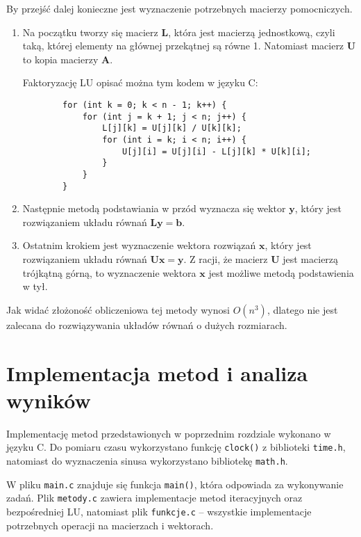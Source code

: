\documentclass{article}
\begin{document}
By przejść dalej konieczne jest wyznaczenie potrzebnych macierzy pomocniczych.
\begin{enumerate}
    \item Na początku tworzy się macierz $\boldsymbol{L}$, która jest macierzą 
    jednostkową, czyli taką, której elementy na głównej przekątnej są równe 1.
    Natomiast macierz $\boldsymbol{U}$ to kopia macierzy $\boldsymbol{A}$.
    
    Faktoryzację LU opisać można tym kodem w języku C:
    
    \begin{lstlisting}
        for (int k = 0; k < n - 1; k++) {
            for (int j = k + 1; j < n; j++) {
                L[j][k] = U[j][k] / U[k][k];
                for (int i = k; i < n; i++) {
                    U[j][i] = U[j][i] - L[j][k] * U[k][i];
                }
            }
        }
    \end{lstlisting}

    \item Następnie metodą podstawiania w przód wyznacza 
    się wektor $\boldsymbol{y}$,
    który jest rozwiązaniem układu równań $\boldsymbol{Ly = b}$.

    \item Ostatnim krokiem jest wyznaczenie wektora rozwiązań $\boldsymbol{x}$,
    który jest rozwiązaniem układu równań $\boldsymbol{Ux = y}$.
    Z racji, że macierz $\boldsymbol{U}$ jest macierzą trójkątną górną,
    to wyznaczenie wektora $\boldsymbol{x}$ jest możliwe metodą 
    podstawienia w tył.
\end{enumerate}

Jak widać złożoność obliczeniowa tej metody wynosi $O(n^3)$, dlatego
nie jest zalecana do rozwiązywania układów równań o dużych rozmiarach.

\section{Implementacja metod i analiza wyników}
Implementację metod przedstawionych w poprzednim rozdziale wykonano w języku C.
Do pomiaru czasu wykorzystano funkcję \texttt{clock()} z biblioteki \texttt{time.h},
natomiast do wyznaczenia sinusa wykorzystano bibliotekę \texttt{math.h}.

W pliku \texttt{main.c} znajduje się funkcja \texttt{main()}, która odpowiada za
wykonywanie zadań. Plik \texttt{metody.c} zawiera implementacje metod iteracyjnych
oraz bezpośredniej LU, natomiast plik \texttt{funkcje.c} -- wszystkie implementacje
potrzebnych operacji na macierzach i wektorach.
\end{document}
